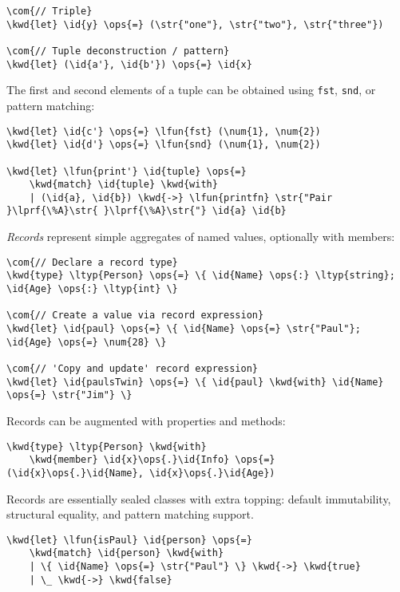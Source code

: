 \documentclass[10pt,landscape]{article}
\newcommand{\id}[1]{\textcolor[HTML]{000000}{#1}}
\newcommand{\str}[1]{\textcolor[HTML]{A31515}{#1}}
\newcommand{\kwd}[1]{\textcolor[HTML]{0000FF}{#1}}
\newcommand{\com}[1]{\textcolor[HTML]{008000}{#1}}
\newcommand{\ops}[1]{\textcolor[HTML]{000000}{#1}}
\newcommand{\num}[1]{\textcolor[HTML]{000000}{#1}}
\newcommand{\ltyp}[1]{\textcolor[HTML]{2B91AF}{#1}}
\newcommand{\lfun}[1]{\textcolor[HTML]{AA5500}{#1}}
\newcommand{\lprf}[1]{\textcolor[HTML]{2B91AF}{#1}}
\begin{document}
\begin{multicols}{3}
\begin{Verbatim}[commandchars=\\\{\}]
\com{// Triple}
\kwd{let} \id{y} \ops{=} (\str{"one"}, \str{"two"}, \str{"three"}) 

\com{// Tuple deconstruction / pattern}
\kwd{let} (\id{a'}, \id{b'}) \ops{=} \id{x}

\end{Verbatim}



The first and second elements of a tuple can be obtained using \texttt{fst}, \texttt{snd}, or pattern matching:
\begin{Verbatim}[commandchars=\\\{\}]
\kwd{let} \id{c'} \ops{=} \lfun{fst} (\num{1}, \num{2})
\kwd{let} \id{d'} \ops{=} \lfun{snd} (\num{1}, \num{2})

\kwd{let} \lfun{print'} \id{tuple} \ops{=}
    \kwd{match} \id{tuple} \kwd{with}
    | (\id{a}, \id{b}) \kwd{->} \lfun{printfn} \str{"Pair }\lprf{\%A}\str{ }\lprf{\%A}\str{"} \id{a} \id{b}

\end{Verbatim}



\emph{Records} represent simple aggregates of named values, optionally with members:
\begin{Verbatim}[commandchars=\\\{\}]
\com{// Declare a record type}
\kwd{type} \ltyp{Person} \ops{=} \{ \id{Name} \ops{:} \ltyp{string}; \id{Age} \ops{:} \ltyp{int} \}

\com{// Create a value via record expression}
\kwd{let} \id{paul} \ops{=} \{ \id{Name} \ops{=} \str{"Paul"}; \id{Age} \ops{=} \num{28} \}

\com{// 'Copy and update' record expression}
\kwd{let} \id{paulsTwin} \ops{=} \{ \id{paul} \kwd{with} \id{Name} \ops{=} \str{"Jim"} \}

\end{Verbatim}



Records can be augmented with properties and methods:
\begin{Verbatim}[commandchars=\\\{\}]
\kwd{type} \ltyp{Person} \kwd{with}
    \kwd{member} \id{x}\ops{.}\id{Info} \ops{=} (\id{x}\ops{.}\id{Name}, \id{x}\ops{.}\id{Age})

\end{Verbatim}



Records are essentially sealed classes with extra topping: default immutability, structural equality, and pattern matching support.
\begin{Verbatim}[commandchars=\\\{\}]
\kwd{let} \lfun{isPaul} \id{person} \ops{=}
    \kwd{match} \id{person} \kwd{with}
    | \{ \id{Name} \ops{=} \str{"Paul"} \} \kwd{->} \kwd{true}
    | \_ \kwd{->} \kwd{false}


\end{Verbatim}
\end{multicols}
\end{document}
